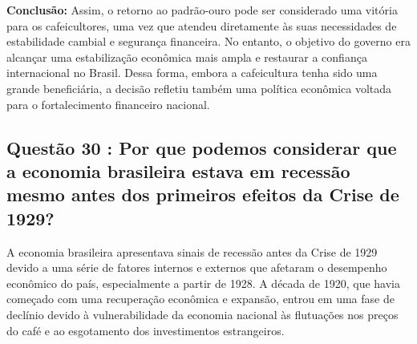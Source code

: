 \documentclass[a4paper,12pt]{article}[abntex2]
\begin{document}
\textbf{Conclusão:}
Assim, o retorno ao padrão-ouro pode ser considerado uma vitória para os cafeicultores, uma vez que atendeu diretamente às suas necessidades de estabilidade cambial e segurança financeira. No entanto, o objetivo do governo era alcançar uma estabilização econômica mais ampla e restaurar a confiança internacional no Brasil. Dessa forma, embora a cafeicultura tenha sido uma grande beneficiária, a decisão refletiu também uma política econômica voltada para o fortalecimento financeiro nacional.

\subsection{\textbf{Questão 30 : Por que podemos considerar que a economia brasileira estava em recessão mesmo antes dos primeiros efeitos da Crise de 1929?}}

A economia brasileira apresentava sinais de recessão antes da Crise de 1929 devido a uma série de fatores internos e externos que afetaram o desempenho econômico do país, especialmente a partir de 1928. A década de 1920, que havia começado com uma recuperação econômica e expansão, entrou em uma fase de declínio devido à vulnerabilidade da economia nacional às flutuações nos preços do café e ao esgotamento dos investimentos estrangeiros.
\end{document}

